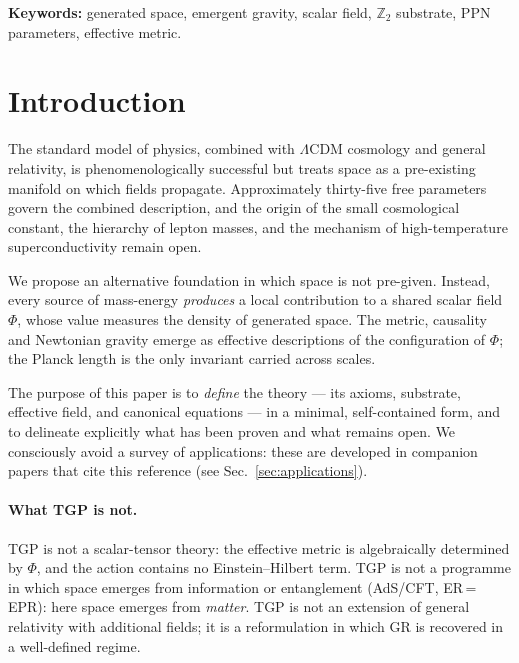 \documentclass[11pt,a4paper]{article}
\renewcommand{\Phi}{\varPhi}
\newcommand{\Zp}{\mathbb{Z}_{2}}
\begin{document}
\noindent\textbf{Keywords:}
generated space, emergent gravity, scalar field, $\Zp$ substrate,
PPN parameters, effective metric.

\tableofcontents
\newpage

\section{Introduction}\label{sec:intro}

The standard model of physics, combined with $\Lambda$CDM cosmology and
general relativity, is phenomenologically successful but treats space as
a pre-existing manifold on which fields propagate. Approximately thirty-five
free parameters govern the combined description, and the origin of the
small cosmological constant, the hierarchy of lepton masses, and the
mechanism of high-temperature superconductivity remain open.

We propose an alternative foundation in which space is not pre-given.
Instead, every source of mass-energy \emph{produces} a local contribution
to a shared scalar field $\Phi$, whose value measures the density of generated
space. The metric, causality and Newtonian gravity emerge as effective
descriptions of the configuration of $\Phi$; the Planck length is the only
invariant carried across scales.

The purpose of this paper is to \emph{define} the theory --- its axioms,
substrate, effective field, and canonical equations --- in a minimal,
self-contained form, and to delineate explicitly what has been proven and
what remains open. We consciously avoid a survey of applications: these are
developed in companion papers that cite this reference (see
Sec.~\ref{sec:applications}).

\paragraph{What TGP is not.} TGP is not a scalar-tensor theory: the
effective metric is algebraically determined by $\Phi$, and the action
contains no Einstein--Hilbert term. TGP is not a programme in which space
emerges from information or entanglement (AdS/CFT, ER\,=\,EPR): here space
emerges from \emph{matter}. TGP is not an extension of general relativity
with additional fields; it is a reformulation in which GR is recovered in
a well-defined regime.
\end{document}
